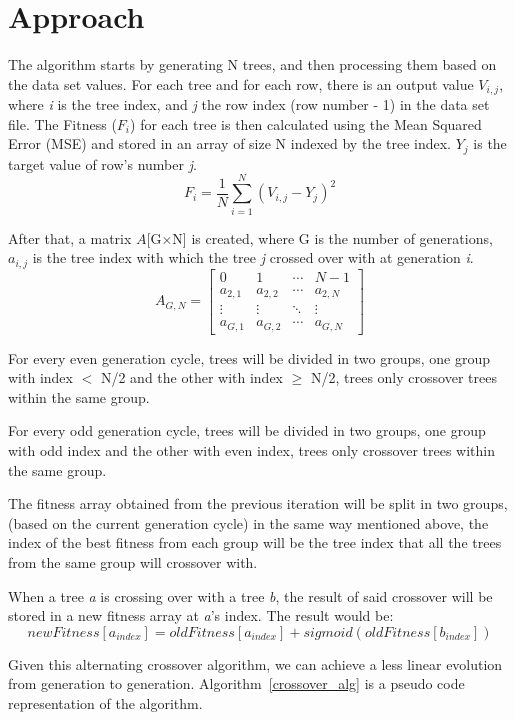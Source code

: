 \documentclass[runningheads]{llncs}
\begin{document}
\section{Approach}
The algorithm starts by generating N trees, and then processing them based on the data set values. For each tree and for each row, there is an output value $V_{i,j}$, where \textit{i} is the tree index, and \textit{j} the row index (row number - 1) in the data set file.
The Fitness ($F_i$) for each tree is then calculated using the Mean Squared Error (MSE) and stored in an array of size N indexed by the tree index. $Y_j$ is the target value of row's number \textit{j}. $$F_i = \frac{1}{N}\sum_{i=1}^{N} (V_{i,j} - Y_j)^{2}$$

After that, a matrix $A$[G$\times$N] is created, where G is the number of generations, $a_{i,j}$ is the tree index with which the tree \textit{j} crossed over with at generation \textit{i}.
\begin{equation*}
A_{G,N} = 
\begin{bmatrix}
0 & 1 & \cdots & N-1 \\
a_{2,1} & a_{2,2} & \cdots & a_{2,N} \\
\vdots  & \vdots  & \ddots & \vdots  \\
a_{G,1} & a_{G,2} & \cdots & a_{G,N} 
\end{bmatrix}
\end{equation*}

For every even generation cycle, trees will be divided in two groups, one group with index $<$ N/2 and the other with index $\geq$ N/2, trees only crossover trees within the same group.

For every odd generation cycle, trees will be divided in two groups, one group with odd index and the other with even index, trees only crossover trees within the same group.

The fitness array obtained from the previous iteration will be split in two groups, (based on the current generation cycle) in the same way mentioned above, the index of the best fitness from each group will be the tree index that all the trees from the same group will crossover with.

When a tree \textit{a} is crossing over with a tree \textit{b}, the result of said crossover will be stored in a new fitness array at \textit{a}'s index. The result would be:$$newFitness[a_{index}] = oldFitness[a_{index}] + sigmoid(oldFitness[b_{index}])$$

Given this alternating crossover algorithm, we can achieve a less linear evolution from generation to generation. Algorithm~\ref{crossover_alg} is a pseudo code representation of the algorithm.
\end{document}
